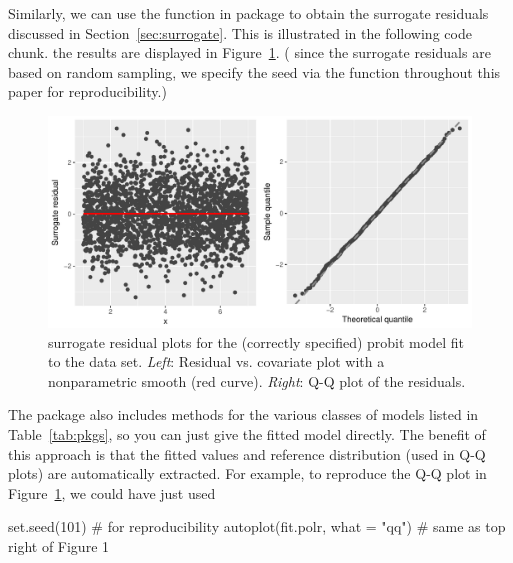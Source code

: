 Similarly, we can use the  function in package  to obtain the surrogate residuals discussed in Section~\ref{sec:surrogate}. This is illustrated in the following code chunk. the results are displayed in Figure~\ref{fig:quadratic-correct-surrogate}. ( since the surrogate residuals are based on random sampling, we specify the seed via the  function throughout this paper for reproducibility.)
\begin{figure}[!htbp]
  \centering
  \includegraphics[width=1\textwidth]{quadratic-correct-surrogate}
  \caption{surrogate residual plots for the (correctly specified) probit model fit to the  data set. \textit{Left}: Residual vs. covariate plot with a nonparametric smooth (red curve). \textit{Right}: Q-Q plot of the residuals.}
  \label{fig:quadratic-correct-surrogate}
\end{figure}

The  package also includes  methods for the various classes of models listed in Table~\ref{tab:pkgs}, so you can just give  the fitted model directly. The benefit of this approach is that the fitted values and reference distribution (used in Q-Q plots) are automatically extracted. For example, to reproduce the Q-Q plot in Figure~\ref{fig:quadratic-correct-surrogate}, we could have just used
\begin{example}
set.seed(101)  # for reproducibility
autoplot(fit.polr, what = "qq")  # same as top right of Figure 1
\end{example}

